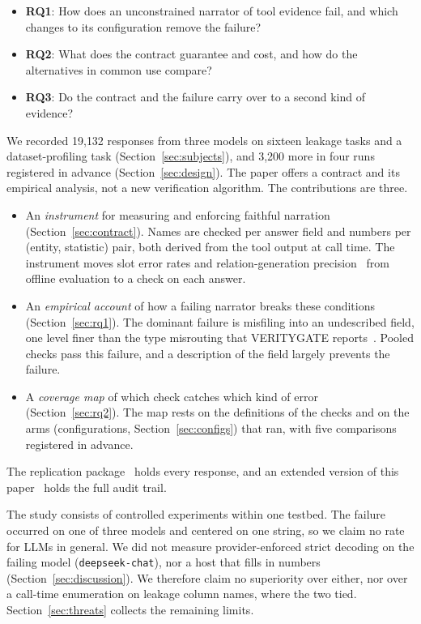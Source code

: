 \documentclass[journal]{IEEEtran}
\begin{document}
\begin{itemize}
\item \textbf{RQ1}: How does an unconstrained narrator of tool evidence fail, and
which changes to its configuration remove the failure?
\item \textbf{RQ2}: What does the contract guarantee and cost, and how do the
alternatives in common use compare?
\item \textbf{RQ3}: Do the contract and the failure carry over to a second kind
of evidence?
\end{itemize}

We recorded 19{,}132 responses from three models on sixteen leakage tasks and a
dataset-profiling task (Section~\ref{sec:subjects}), and 3{,}200 more in four runs registered in advance (Section~\ref{sec:design}). The paper
offers a contract and its empirical analysis, not a new verification algorithm.
The contributions are three.
\begin{itemize}
\item An \emph{instrument} for measuring and enforcing faithful narration
(Section~\ref{sec:contract}). Names are checked per answer field and numbers per
(entity, statistic) pair, both derived from the tool output at call time. The
instrument moves slot error rates and relation-generation
precision~\cite{dusek2020e2e,wiseman2017challenges} from offline evaluation to a
check on each answer.
\item An \emph{empirical account} of how a failing narrator breaks these
conditions (Section~\ref{sec:rq1}). The dominant failure is misfiling into an
undescribed field, one level finer than the type misrouting that VERITYGATE
reports~\cite{gupta2026veritygate}. Pooled checks pass this failure, and a
description of the field largely prevents the failure.
\item A \emph{coverage map} of which check catches which kind of error
(Section~\ref{sec:rq2}). The map rests on the definitions of the checks and on
the arms (configurations, Section~\ref{sec:configs}) that ran, with five comparisons registered in advance.
\end{itemize}
The replication package~\cite{replication} holds every response, and an extended
version of this paper~\cite{extended} holds the full audit trail.

The study consists of controlled experiments within one testbed. The failure
occurred on one of three models and centered on one string, so we claim no rate
for LLMs in general. We did not measure provider-enforced strict decoding on the failing model (\texttt{deepseek-chat}), nor a host that fills in numbers (Section~\ref{sec:discussion}). We therefore claim no
superiority over either, nor over a call-time enumeration on leakage column
names, where the two tied. Section~\ref{sec:threats} collects the remaining
limits.
\end{document}
